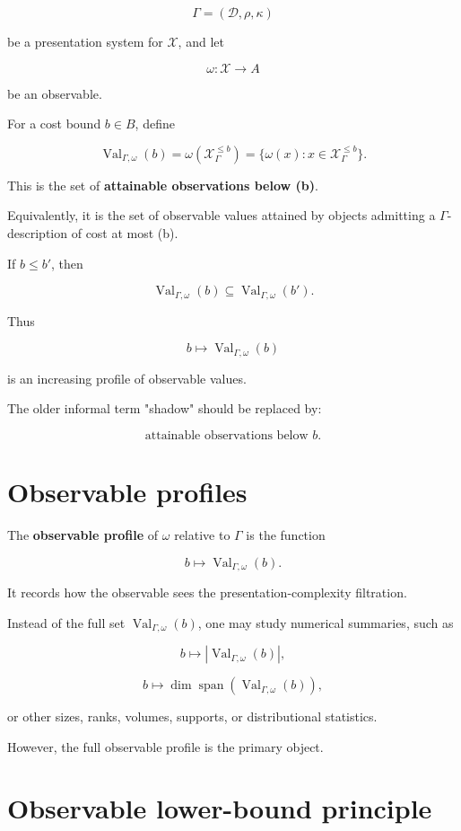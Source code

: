 \documentclass[11pt]{article}
\begin{document}
\[
\Gamma=(\mathcal D,\rho,\kappa)
\]

be a presentation system for \(\mathcal X\), and let

\[
\omega:\mathcal X\to A
\]

be an observable.

For a cost bound \(b\in B\), define

\[
\operatorname{Val}_{\Gamma,\omega}(b)=\omega(\mathcal X_\Gamma^{\leq b})=\{\omega(x):x\in\mathcal X_\Gamma^{\leq b}\}.
\]

This is the set of \textbf{attainable observations below (b)}.

Equivalently, it is the set of observable values attained by objects admitting a \(\Gamma\)-description of cost at most (b).

If \(b\leq b'\), then

\[
\operatorname{Val}_{\Gamma,\omega}(b)
\subseteq
\operatorname{Val}_{\Gamma,\omega}(b').
\]

Thus

\[
b\mapsto \operatorname{Val}_{\Gamma,\omega}(b)
\]

is an increasing profile of observable values.

The older informal term "shadow" should be replaced by:

\[
\text{attainable observations below }b.
\]


\section{Observable profiles}

The \textbf{observable profile} of \(\omega\) relative to \(\Gamma\) is the function

\[
b\longmapsto \operatorname{Val}_{\Gamma,\omega}(b).
\]

It records how the observable sees the presentation-complexity filtration.

Instead of the full set \(\operatorname{Val}_{\Gamma,\omega}(b)\), one may study numerical summaries, such as

\[
b\mapsto |\operatorname{Val}_{\Gamma,\omega}(b)|,
\]

\[
b\mapsto \dim \operatorname{span}(\operatorname{Val}_{\Gamma,\omega}(b)),
\]

or other sizes, ranks, volumes, supports, or distributional statistics.

However, the full observable profile is the primary object.


\section{Observable lower-bound principle}
\end{document}
